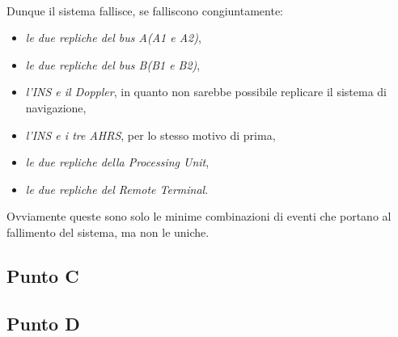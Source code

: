 \\
Dunque il sistema fallisce, se falliscono congiuntamente:
\begin{itemize}
	\item \textit{le due repliche del bus A(A1 e A2)},
	\item \textit{le due repliche del bus B(B1 e B2)},
	\item \textit{l'INS e il Doppler}, in quanto non sarebbe possibile replicare il sistema di navigazione,
	\item \textit{l'INS e i tre AHRS}, per lo stesso motivo di prima,
	\item \textit{le due repliche della Processing Unit},
	\item \textit{le due repliche del Remote Terminal}.
\end{itemize}
Ovviamente queste sono solo le minime combinazioni di eventi che portano al fallimento del sistema, ma non le uniche.
\subsection{Punto C}
\subsection{Punto D}
